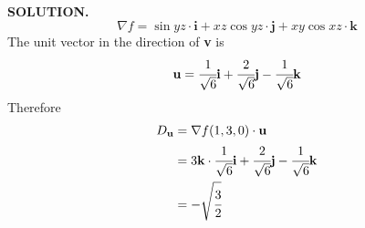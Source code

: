 \documentclass{article}
\begin{document}
{\selectfont \textbf{\textcolor{blue5}{SOLUTION.}}} 
\[\nabla f = \sin{yz} \cdot \textbf{i} + xz\cos{yz} \cdot \textbf{j} + xy\cos{xz} \cdot \textbf{k}\]
The unit vector in the direction of \textbf{v} is 
\[\textbf{u} = \cfrac{1 }{\sqrt{6 }} \textbf{i} + \cfrac{2 }{\sqrt{6 }} \textbf{j} - \cfrac{1 }{\sqrt{6 }} \textbf{k}\]
Therefore 
\begin{align*}
  D _ \textbf{u} & = \nabla f(1,3,0) \cdot \textbf{u} \\
  & = 3 \textbf{k} \cdot \cfrac{1 }{\sqrt{6 }} \textbf{i} + \cfrac{2 }{\sqrt{6 }} \textbf{j} - \cfrac{1 }{\sqrt{6 }} \textbf{k} \\
  & = - \sqrt{\cfrac{3 }{2 }}
\end{align*}
\end{document}
